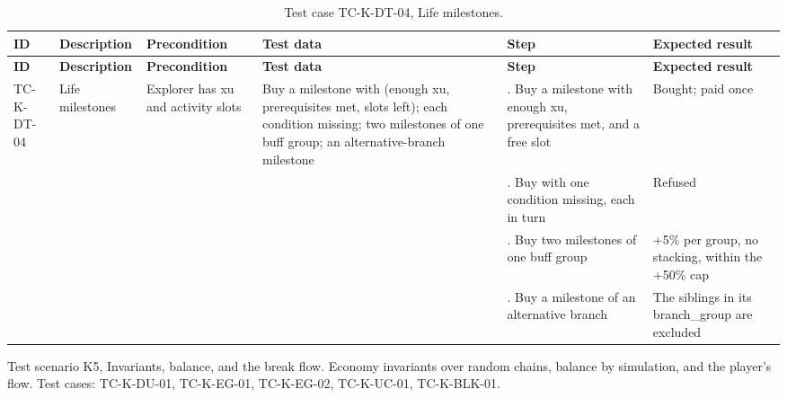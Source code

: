 {\footnotesize{}\renewcommand{\arraystretch}{1.1}
\begin{longtable}{|>{\raggedright\arraybackslash}p{}|>{\raggedright\arraybackslash}p{}|>{\raggedright\arraybackslash}p{}|>{\raggedright\arraybackslash}p{}|>{\raggedright\arraybackslash}p{}|>{\raggedright\arraybackslash}p{}|}
\caption{Test case TC-K-DT-04, Life milestones.} \\
\hline
\textbf{ID} & \textbf{Description} & \textbf{Precondition} & \textbf{Test data} & \textbf{Step} & \textbf{Expected result} \\ \hline
\endfirsthead
\hline
\textbf{ID} & \textbf{Description} & \textbf{Precondition} & \textbf{Test data} & \textbf{Step} & \textbf{Expected result} \\ \hline
\endhead
TC-K-DT-04 & Life milestones & Explorer has xu and activity slots & Buy a milestone with (enough xu, prerequisites met, slots left); each condition missing; two milestones of one buff group; an alternative-\allowbreak{}branch milestone & 1. Buy a milestone with enough xu, prerequisites met, and a free slot & Bought; paid once \\ \cline{5-6}
 &  &  &  & 2. Buy with one condition missing, each in turn & Refused \\ \cline{5-6}
 &  &  &  & 3. Buy two milestones of one buff group & +5\% per group, no stacking, within the +50\% cap \\ \cline{5-6}
 &  &  &  & 4. Buy a milestone of an alternative branch & The siblings in its branch\_\allowbreak{}group are excluded \\ \hline
\end{longtable}
}

Test scenario K5, Invariants, balance, and the break flow. Economy invariants over random chains, balance by simulation, and the player's flow. Test cases: TC-K-DU-01, TC-K-EG-01, TC-K-EG-02, TC-K-UC-01, TC-\allowbreak{}K-\allowbreak{}BLK-\allowbreak{}01.

